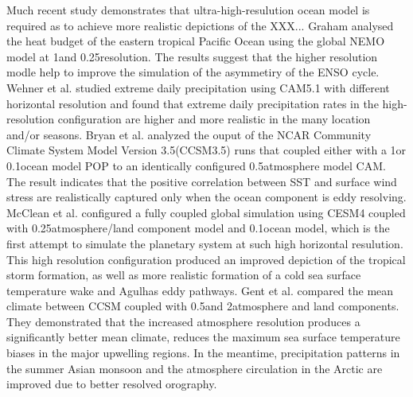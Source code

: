 \documentclass{sig-alternate}
\begin{document}
Much recent study demonstrates that ultra-high-resulution ocean model is required as to achieve more realistic depictions of the XXX...
Graham \cite{graham2014importance} analysed the heat budget of the eastern tropical Pacific Ocean using the global NEMO model at 1\degree and 0.25\degree resolution. The results suggest that the higher resolution modle help to improve the simulation of the asymmetiry of the ENSO cycle. 
Wehner et al. \cite{wehner2014effect} studied extreme daily precipitation using CAM5.1 with different horizontal resolution and found that extreme daily precipitation rates in the high-resolution configuration are higher and more realistic in the many location and/or seasons. 
Bryan et al. \cite{bryan2010frontal} analyzed the ouput of the NCAR Community Climate System Model Version 3.5(CCSM3.5) runs that coupled either with a 1\degree  or 0.1\degree ocean model POP to an identically configured 0.5\degree atmosphere model CAM. The result indicates that the positive correlation between SST and surface wind stress are realistically captured only when the ocean component is eddy resolving. 
McClean et al. \cite{mcclean2011prototype} configured a fully coupled global simulation using CESM4 coupled with 0.25\degree atmosphere/land component model and 0.1\degree ocean model, which is the first attempt to simulate the planetary system at such high horizontal resulution. 
This high resolution configuration produced an improved depiction of the tropical storm formation, as well as more realistic formation of a cold sea surface temperature wake and Agulhas eddy pathways. 
Gent et al. \cite{gent2010improvements} compared the mean climate between CCSM coupled with 0.5\degree and 2\degree atmosphere and land components. 
They demonstrated that the increased atmosphere resolution produces a significantly better mean climate, reduces the maximum sea surface temperature biases in the major upwelling regions. 
In the meantime, precipitation patterns in the summer Asian monsoon and the atmosphere circulation in the Arctic are improved due to better resolved orography. 
\end{document}
